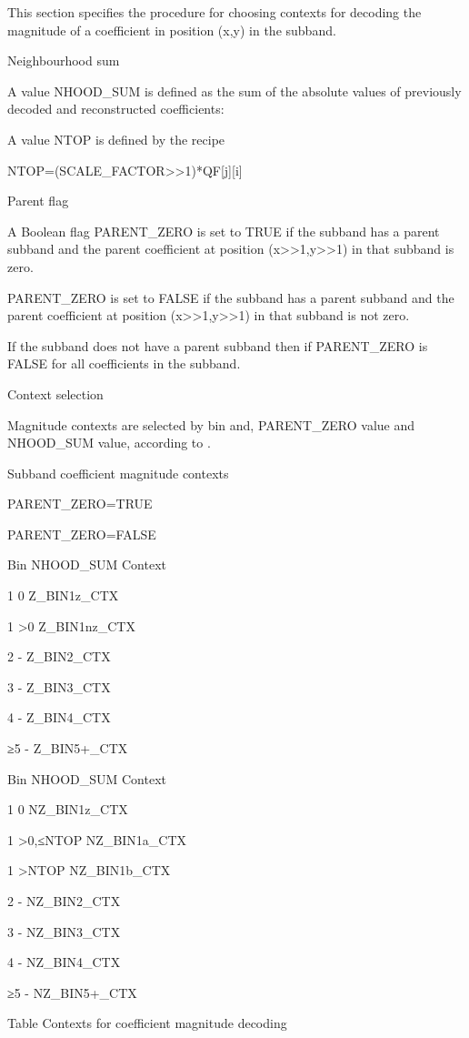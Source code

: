 This section specifies the procedure for choosing contexts for decoding
the magnitude of a coefficient in position (x,y) in the subband.

Neighbourhood sum

A value NHOOD\_SUM is defined as the sum of the absolute values of
previously decoded and reconstructed coefficients:



A value NTOP is defined by the recipe

NTOP=(SCALE\_FACTOR>>1)*QF[j][i]

Parent flag

A Boolean flag PARENT\_ZERO is set to TRUE if the subband has a parent
subband and the parent coefficient at position (x>>1,y>>1) in that
subband is zero. 

PARENT\_ZERO is set to FALSE if the subband has a parent subband and the
parent coefficient at position (x>>1,y>>1) in that subband is not zero.

If the subband does not have a parent subband then if PARENT\_ZERO is FALSE for all
coefficients in the subband. 

Context selection

Magnitude contexts are selected by bin and, PARENT\_ZERO value and
NHOOD\_SUM value, according to .


Subband coefficient magnitude contexts

PARENT\_ZERO=TRUE

PARENT\_ZERO=FALSE

Bin       NHOOD\_SUM     Context

  1                  0                         Z\_BIN1z\_CTX

  1                 >0                        Z\_BIN1nz\_CTX

  2                 -                           Z\_BIN2\_CTX

  3                 -                           Z\_BIN3\_CTX

  4                 -                           Z\_BIN4\_CTX

  ≥5               -                           Z\_BIN5+\_CTX

Bin       NHOOD\_SUM     Context

  1                  0                         NZ\_BIN1z\_CTX

  1                 >0,≤NTOP          NZ\_BIN1a\_CTX

  1                 >NTOP               NZ\_BIN1b\_CTX

  2                 -                          NZ\_BIN2\_CTX

  3                 -                          NZ\_BIN3\_CTX

  4                 -                          NZ\_BIN4\_CTX

  ≥5               -                          NZ\_BIN5+\_CTX 


Table   Contexts for coefficient magnitude decoding


